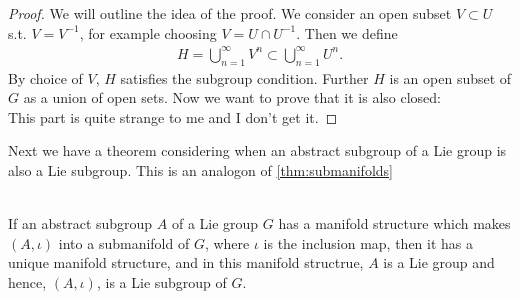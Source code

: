 \begin{proof}
We will outline the idea of the proof. We consider an open subset $V \subset U$ s.t. $V=V^{-1}$, for example choosing $V = U\cap U^{-1}$. Then we define 
\begin{align*}
H = \bigcup_{n=1}^{\infty} V^n \subset \bigcup_{n=1}^{\infty} U^n.
\end{align*}
By choice of $V$, $H$ satisfies the subgroup condition. Further $H$ is an open subset of $G$ as a union of open sets. Now we want to prove that it is also closed:\\
This part is quite strange to me and I don't get it.
\end{proof}
Next we have a theorem considering when an abstract subgroup of a Lie group is also a Lie subgroup. This is an analogon of \ref{thm:submanifolds}
\begin{theorem}
\textup{\cite[3.20]{Warner1983}}\\
If an abstract subgroup $A$ of a Lie group $G$ has a manifold structure which makes $(A, \iota)$ into a submanifold of $G$, where $\iota$ is the inclusion map, then it has a unique manifold structure, and in this manifold structrue, $A$ is a Lie group and hence, $(A, \iota)$, is a Lie subgroup of $G$.
\end{theorem}

